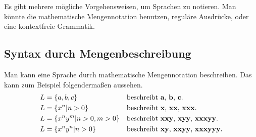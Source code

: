 \documentclass[ngerman,abstract=true]{scrartcl}
\begin{document}
Es gibt mehrere mögliche Vorgehensweisen, um Sprachen zu notieren. Man könnte die mathematische Mengennotation benutzen, reguläre Ausdrücke, oder eine kontextfreie Grammatik.

\subsection{Syntax durch Mengenbeschreibung}

Man kann eine Sprache durch mathematische Mengennotation beschreiben. Das kann zum Beispiel folgendermaßen aussehen.
\begin{align*}
L &= \{a, b, c\} && \text{beschreibt \textbf{a}, \textbf{b}, \textbf{c}.}\\
L &= \{x^n | n > 0\} && \text{beschreibt \textbf{x}, \textbf{xx}, \textbf{xxx}.}\\
L &= \{x^ny^m|n > 0, m > 0\} && \text{beschreibt \textbf{xxy}, \textbf{xyy}, \textbf{xxxyy}.}\\
L &= \{x^ny^n|n > 0\} && \text{beschreibt \textbf{xy}, \textbf{xxyy}, \textbf{xxxyyy}.}\\
\end{align*}
\end{document}
